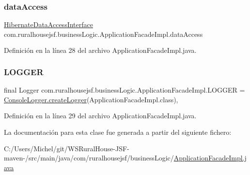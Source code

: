 \subsubsection{\texorpdfstring{dataAccess}{dataAccess}}
{\footnotesize\ttfamily \mbox{\hyperlink{interfacecom_1_1ruralhousejsf_1_1data_access_1_1_hibernate_data_access_interface}{Hibernate\+Data\+Access\+Interface}} com.\+ruralhousejsf.\+business\+Logic.\+Application\+Facade\+Impl.\+data\+Access\hspace{0.3cm}{\ttfamily [private]}}



Definición en la línea 28 del archivo Application\+Facade\+Impl.\+java.

\mbox{\label{classcom_1_1ruralhousejsf_1_1business_logic_1_1_application_facade_impl_a4d2aed9fcae945d5ffaa63947bb56cde}} 
\subsubsection{\texorpdfstring{LOGGER}{LOGGER}}
{\footnotesize\ttfamily final Logger com.\+ruralhousejsf.\+business\+Logic.\+Application\+Facade\+Impl.\+L\+O\+G\+G\+ER = \mbox{\hyperlink{classcom_1_1ruralhousejsf_1_1logger_1_1_console_logger_a520321643663e37d95761134a35505cd}{Console\+Logger.\+create\+Logger}}(Application\+Facade\+Impl.\+class)\hspace{0.3cm}{\ttfamily [static]}, {\ttfamily [private]}}



Definición en la línea 29 del archivo Application\+Facade\+Impl.\+java.



La documentación para esta clase fue generada a partir del siguiente fichero\+:\begin{DoxyCompactItemize}
\item 
C\+:/\+Users/\+Michel/git/\+W\+S\+Rural\+House-\/\+J\+S\+F-\/maven-\//src/main/java/com/ruralhousejsf/business\+Logic/\mbox{\hyperlink{_application_facade_impl_8java}{Application\+Facade\+Impl.\+java}}\end{DoxyCompactItemize}
